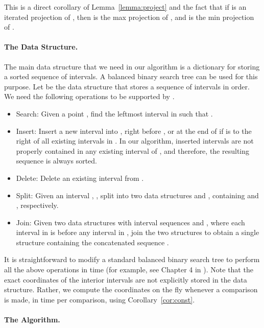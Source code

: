 \documentclass[12pt]{dalthesis}
\def\favoritefont{\bfseries \sffamily}
\def\QED{\ensuremath{{\Box}}}
\def\markatright#1{\leavevmode\unskip\nobreak\quad\hspace*{\fill}{#1}}
\newenvironment{proof}
	{\begin{trivlist}\item[\hskip\labelsep{\favoritefont Proof:}]}
	{\markatright{\QED}\end{trivlist}}
\begin{document}
\begin{proof}
	This is a direct corollary of Lemma~\ref{lemma:project}
	and the fact that if  is an iterated projection of ,
	then  is the max projection of , and  is the min projection of .
\end{proof}


\paragraph{The Data Structure.}
The main data structure that we need in our algorithm is a dictionary 
for storing a sorted sequence of intervals. 
A balanced binary search tree can be used for this purpose.
Let  be the data structure that stores a sequence 
 of intervals in  order.
We need the following operations to be supported by .

\begin{itemize}
	\item[] {\sc Search:} 
		Given a point , find the leftmost interval  in  such that .
	\item[] {\sc Insert:} 
		Insert a new interval  into , right before ,
		or at the end of  if  is to the right of all existing intervals in . In our algorithm, inserted intervals are not properly contained in any existing interval of , and therefore, the
		resulting sequence is always sorted.
	\item[] {\sc Delete:} 
		Delete an existing interval  from . 
	\item[] {\sc Split:} 
		Given an interval , , split  into 
		two data structures  and , containing  and  , respectively. 
	\item[] {\sc Join:} 
		Given two data structures with interval sequences  and ,
		where each interval in  is before any interval in ,
		join the two structures to obtain a single structure  
		containing the concatenated sequence .
\end{itemize}

It is straightforward to 
modify a standard balanced binary search tree
to perform all the above operations in  time
(for example, see Chapter 4 in \cite{Tarjan83}).
Note that the exact coordinates of the interior intervals are not explicitly stored in the data structure.
Rather, we compute the coordinates on the fly whenever a comparison is made, 
in  time per comparison,  using Corollary~\ref{cor:const}.


\paragraph{The Algorithm.}
\end{document}

